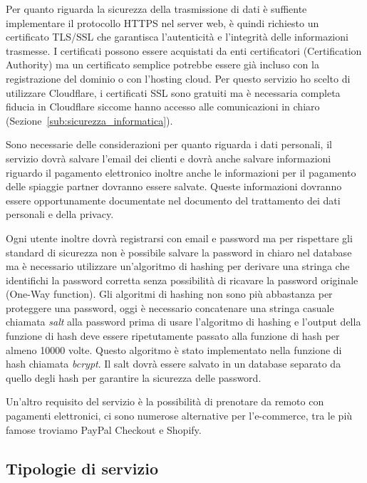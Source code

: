 Per quanto riguarda la sicurezza della trasmissione di dati \`e suffiente implementare il protocollo HTTPS nel server web, \`e quindi richiesto un certificato TLS/SSL che garantisca l'autenticit\`a e l'integrit\`a delle informazioni trasmesse. I certificati possono essere acquistati da enti certificatori (Certification Authority) ma un certificato semplice potrebbe essere gi\`a incluso con la registrazione del dominio o con l'hosting cloud. Per questo servizio ho scelto di utilizzare Cloudflare, i certificati SSL sono gratuiti ma \`e necessaria completa fiducia in Cloudflare siccome hanno accesso alle comunicazioni in chiaro (Sezione~\ref{sub:sicurezza_informatica}). 

Sono necessarie delle considerazioni per quanto riguarda i dati personali, il servizio dovr\`a salvare l'email dei clienti e dovr\`a anche salvare informazioni riguardo il pagamento elettronico inoltre anche le informazioni per il pagamento delle spiaggie partner dovranno essere salvate. 
Queste informazioni dovranno essere opportunamente documentate nel documento del trattamento dei dati personali e della privacy. 

Ogni utente inoltre dovr\`a registrarsi con email e password ma per rispettare gli standard di sicurezza non \`e possibile salvare la password in chiaro nel database ma \`e necessario utilizzare un'algoritmo di hashing per derivare una stringa che identifichi la password corretta senza possibilit\`a di ricavare la password originale (One-Way function). Gli algoritmi di hashing non sono pi\`u abbastanza per proteggere una password, oggi \`e necessario concatenare una stringa casuale chiamata \emph{salt} alla password prima di usare l'algoritmo di hashing e l'output della funzione di hash deve essere ripetutamente passato alla funzione di hash per almeno 10000 volte. Questo algoritmo \`e stato implementato nella funzione di hash chiamata \emph{bcrypt}. Il salt dovr\`a essere salvato in un database separato da quello degli hash per garantire la sicurezza delle password.

Un'altro requisito del servizio \`e la possibilit\`a di prenotare da remoto con pagamenti elettronici, ci sono numerose alternative per l'e-commerce, tra le pi\`u famose troviamo PayPal Checkout e Shopify.

\subsection{Tipologie di servizio}%
\label{sub:tipologie_di_servizio}

